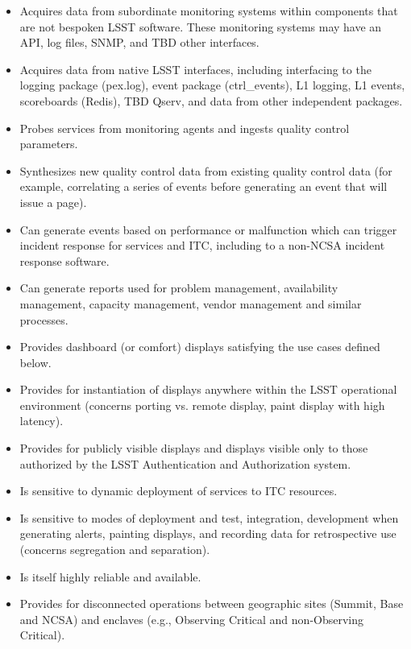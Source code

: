 \begin{itemize}

\item Acquires data from subordinate monitoring systems within components that 
are not bespoken LSST software. These monitoring systems may have an API, log 
files, SNMP, and TBD other interfaces.

\item Acquires data from native LSST interfaces, including interfacing to the 
logging package (pex.log), event package (ctrl\_events), L1 logging, L1 events, 
scoreboards (Redis), TBD Qserv, and data from other independent packages.

\item Probes services from monitoring agents and ingests quality control 
parameters.

\item Synthesizes new quality control data from existing quality control data 
(for example, correlating a series of events before generating an event that 
will issue a page).

\item Can generate events based on performance or malfunction which can trigger 
incident response for services and ITC, including to a non-NCSA incident 
response software.

\item Can generate reports used for problem management, availability management, 
capacity management, vendor management and similar processes.

\item Provides dashboard (or comfort) displays satisfying the use cases defined 
below.

\item Provides for instantiation of displays anywhere within the LSST 
operational environment (concerns porting vs. remote display, paint display with 
high latency).

\item Provides for publicly visible displays and displays visible only to those 
authorized by the LSST Authentication and Authorization system.

\item Is sensitive to dynamic deployment of services to ITC resources.

\item Is sensitive to modes of deployment and test, integration, development 
when generating alerts, painting displays, and recording data for retrospective 
use (concerns segregation and separation).

\item Is itself highly reliable and available.

\item Provides for disconnected operations between geographic sites (Summit, 
Base and NCSA) and enclaves (e.g., Observing Critical and non-Observing 
Critical).

\end{itemize}

